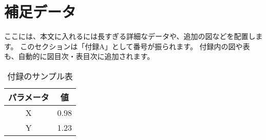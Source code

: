 \section{補足データ}

ここには、本文に入れるには長すぎる詳細なデータや、追加の図などを配置します。
このセクションは「付録A」として番号が振られます。
付録内の図や表も、自動的に図目次・表目次に追加されます。

\begin{table}[htbp]
  \centering
  \caption{付録のサンプル表}
  \label{tab:appendix-sample}
  \begin{tabular}{|c|c|}
    \hline
    パラメータ & 値 \\
    \hline
    X & 0.98 \\
    Y & 1.23 \\
    \hline
  \end{tabular}
\end{table}
